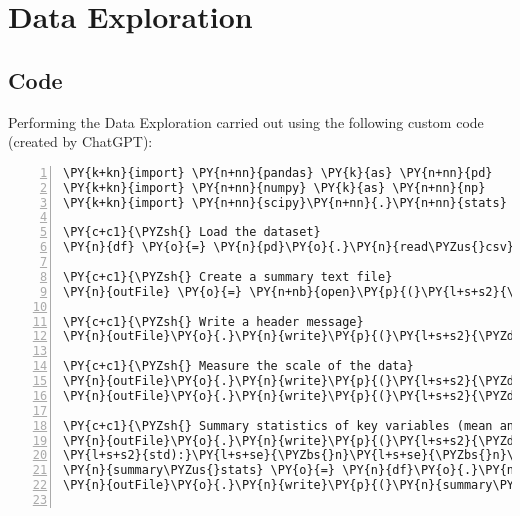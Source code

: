 \documentclass[12pt]{article}
\begin{document}
\section{Data Exploration} \subsection{Code}Performing the Data Exploration carried out using the following custom code (created by ChatGPT):

\begin{Verbatim}[commandchars=\\\{\},numbers=left,firstnumber=1,stepnumber=1,formatcom=\footnotesize]
\PY{k+kn}{import} \PY{n+nn}{pandas} \PY{k}{as} \PY{n+nn}{pd}
\PY{k+kn}{import} \PY{n+nn}{numpy} \PY{k}{as} \PY{n+nn}{np}
\PY{k+kn}{import} \PY{n+nn}{scipy}\PY{n+nn}{.}\PY{n+nn}{stats} \PY{k}{as} \PY{n+nn}{stats}

\PY{c+c1}{\PYZsh{} Load the dataset}
\PY{n}{df} \PY{o}{=} \PY{n}{pd}\PY{o}{.}\PY{n}{read\PYZus{}csv}\PY{p}{(}\PY{l+s+s1}{\PYZsq{}}\PY{l+s+s1}{diabetes\PYZus{}binary\PYZus{}health\PYZus{}indicators\PYZus{}BRFSS2015.csv}\PY{l+s+s1}{\PYZsq{}}\PY{p}{)}

\PY{c+c1}{\PYZsh{} Create a summary text file}
\PY{n}{outFile} \PY{o}{=} \PY{n+nb}{open}\PY{p}{(}\PY{l+s+s2}{\PYZdq{}}\PY{l+s+s2}{data\PYZus{}exploration.txt}\PY{l+s+s2}{\PYZdq{}}\PY{p}{,} \PY{l+s+s2}{\PYZdq{}}\PY{l+s+s2}{w}\PY{l+s+s2}{\PYZdq{}}\PY{p}{)}

\PY{c+c1}{\PYZsh{} Write a header message}
\PY{n}{outFile}\PY{o}{.}\PY{n}{write}\PY{p}{(}\PY{l+s+s2}{\PYZdq{}}\PY{l+s+s2}{Data Exploration Results:}\PY{l+s+se}{\PYZbs{}n}\PY{l+s+se}{\PYZbs{}n}\PY{l+s+s2}{\PYZdq{}}\PY{p}{)}

\PY{c+c1}{\PYZsh{} Measure the scale of the data}
\PY{n}{outFile}\PY{o}{.}\PY{n}{write}\PY{p}{(}\PY{l+s+s2}{\PYZdq{}}\PY{l+s+s2}{Number of rows: }\PY{l+s+si}{\PYZob{}\PYZcb{}}\PY{l+s+se}{\PYZbs{}n}\PY{l+s+s2}{\PYZdq{}}\PY{o}{.}\PY{n}{format}\PY{p}{(}\PY{n+nb}{len}\PY{p}{(}\PY{n}{df}\PY{p}{)}\PY{p}{)}\PY{p}{)}
\PY{n}{outFile}\PY{o}{.}\PY{n}{write}\PY{p}{(}\PY{l+s+s2}{\PYZdq{}}\PY{l+s+s2}{Number of columns: }\PY{l+s+si}{\PYZob{}\PYZcb{}}\PY{l+s+se}{\PYZbs{}n}\PY{l+s+se}{\PYZbs{}n}\PY{l+s+s2}{\PYZdq{}}\PY{o}{.}\PY{n}{format}\PY{p}{(}\PY{n+nb}{len}\PY{p}{(}\PY{n}{df}\PY{o}{.}\PY{n}{columns}\PY{p}{)}\PY{p}{)}\PY{p}{)}

\PY{c+c1}{\PYZsh{} Summary statistics of key variables (mean and std)}
\PY{n}{outFile}\PY{o}{.}\PY{n}{write}\PY{p}{(}\PY{l+s+s2}{\PYZdq{}}\PY{l+s+s2}{Summary statistics of key variables (mean and }\PY{l+s+se}{\PYZbs{}}
\PY{l+s+s2}{std):}\PY{l+s+se}{\PYZbs{}n}\PY{l+s+se}{\PYZbs{}n}\PY{l+s+s2}{\PYZdq{}}\PY{p}{)}
\PY{n}{summary\PYZus{}stats} \PY{o}{=} \PY{n}{df}\PY{o}{.}\PY{n}{describe}\PY{p}{(}\PY{p}{)}\PY{o}{.}\PY{n}{loc}\PY{p}{[}\PY{p}{[}\PY{l+s+s1}{\PYZsq{}}\PY{l+s+s1}{mean}\PY{l+s+s1}{\PYZsq{}}\PY{p}{,} \PY{l+s+s1}{\PYZsq{}}\PY{l+s+s1}{std}\PY{l+s+s1}{\PYZsq{}}\PY{p}{]}\PY{p}{]}
\PY{n}{outFile}\PY{o}{.}\PY{n}{write}\PY{p}{(}\PY{n}{summary\PYZus{}stats}\PY{o}{.}\PY{n}{to\PYZus{}string}\PY{p}{(}\PY{p}{)} \PY{o}{+} \PY{l+s+s2}{\PYZdq{}}\PY{l+s+se}{\PYZbs{}n}\PY{l+s+se}{\PYZbs{}n}\PY{l+s+s2}{\PYZdq{}}\PY{p}{)}


\end{Verbatim}
\end{document}
